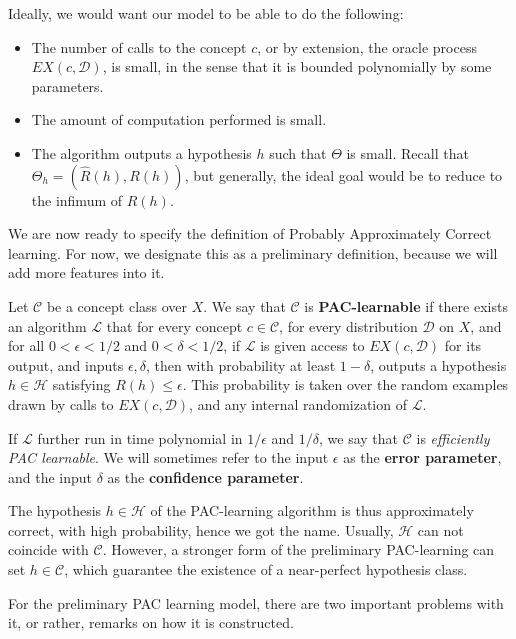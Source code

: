 Ideally, we would want our model to be able to do the following: 
\begin{itemize}
    \item The number of calls to the concept $c$, or by extension, the oracle process $EX(c,\mathcal{D})$, is small, in the sense that it is bounded polynomially by some parameters. 
    \item The amount of computation performed is small. 
    \item The algorithm outputs a hypothesis $h$ such that $\Theta$ is small. Recall that $\Theta_{h} = (\hat{R}(h),R(h))$, but generally, the ideal goal would be to reduce to the infimum of $R(h)$. 
\end{itemize}

We are now ready to specify the definition of Probably Approximately Correct learning. For now, we designate this as a preliminary definition, because we will add more features into it. 

\begin{definition}
    Let $\mathcal{C}$ be a concept class over $X$. We say that $\mathcal{C}$ is \textbf{PAC-learnable} if there exists an algorithm $\mathcal{L}$ that for every concept $c\in \mathcal{C}$, for every distribution $\mathcal{D}$ on $X$, and for all $0<\epsilon < 1/2$ and $0< \delta < 1/2$, if $\mathcal{L}$ is given access to $EX(c,\mathcal{D})$ for its output, and inputs $\epsilon, \delta$, then with probability at least $1-\delta$, outputs a hypothesis $h\in \mathcal{H}$ satisfying $R(h)\leq \epsilon$. This probability is taken over the random examples drawn by calls to $EX(c,\mathcal{D})$, and any internal randomization of $\mathcal{L}$. 

    If $\mathcal{L}$ further run in time polynomial in $1/\epsilon$ and $1/\delta$, we say that $\mathcal{C}$ is \textit{efficiently PAC learnable}. We will sometimes refer to the input $\epsilon$ as the \textbf{error parameter}, and the input $\delta$ as the \textbf{confidence parameter}.
\end{definition}

The hypothesis $h\in \mathcal{H}$ of the PAC-learning algorithm is thus approximately correct, with high probability, hence we got the name. Usually, $\mathcal{H}$ can not coincide with $\mathcal{C}$. However, a stronger form of the preliminary PAC-learning can set $h\in\mathcal{C}$, which guarantee the existence of a near-perfect hypothesis class. 

For the preliminary PAC learning model, there are two important problems with it, or rather, remarks on how it is constructed. 

